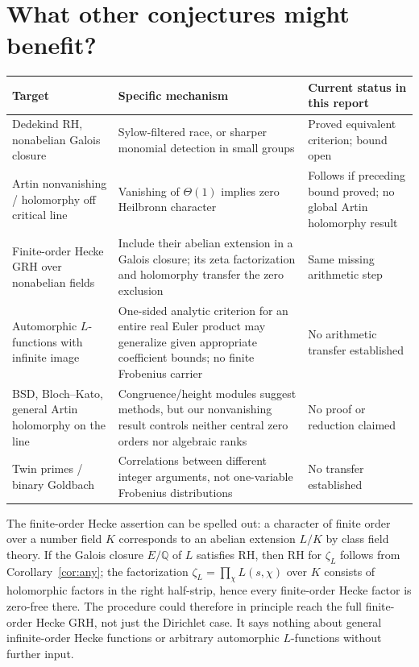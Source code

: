 \documentclass[11pt]{article}
\theoremstyle{remark}\newtheorem{remark}[theorem]{Remark}
\newcommand{\Q}{\mathbb Q}
\begin{document}
\section{What other conjectures might benefit?}
\begin{center}
\small
\begin{tabular}{@{}p{.25\linewidth}p{.40\linewidth}p{.28\linewidth}@{}}
\toprule
Target & Specific mechanism & Current status in this report\\
\midrule
Dedekind RH, nonabelian Galois closure & Sylow-filtered race, or sharper monomial detection in small groups & Proved equivalent criterion; bound open\\
Artin nonvanishing / holomorphy off critical line & Vanishing of $\Theta(1)$ implies zero Heilbronn character & Follows if preceding bound proved; no global Artin holomorphy result\\
Finite-order Hecke GRH over nonabelian fields & Include their abelian extension in a Galois closure; its zeta factorization and holomorphy transfer the zero exclusion & Same missing arithmetic step\\
Automorphic $L$-functions with infinite image & One-sided analytic criterion for an entire real Euler product may generalize given appropriate coefficient bounds; no finite Frobenius carrier & No arithmetic transfer established\\
BSD, Bloch--Kato, general Artin holomorphy on the line & Congruence/height modules suggest methods, but our nonvanishing result controls neither central zero orders nor algebraic ranks & No proof or reduction claimed\\
Twin primes / binary Goldbach & Correlations between different integer arguments, not one-variable Frobenius distributions & No transfer established\\
\bottomrule
\end{tabular}
\end{center}
The finite-order Hecke assertion can be spelled out: a character of finite order over a number field $K$ corresponds to an abelian extension $L/K$ by class field theory. If the Galois closure $E/\Q$ of $L$ satisfies RH, then RH for $\zeta_L$ follows from Corollary~\ref{cor:any}; the factorization $\zeta_L=\prod_{\chi}L(s,\chi)$ over $K$ consists of holomorphic factors in the right half-strip, hence every finite-order Hecke factor is zero-free there. The procedure could therefore in principle reach the full finite-order Hecke GRH, not just the Dirichlet case. It says nothing about general infinite-order Hecke functions or arbitrary automorphic $L$-functions without further input.
\end{document}
